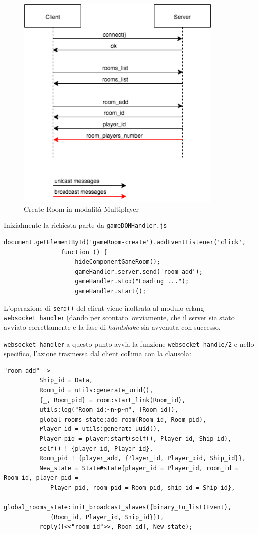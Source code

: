 \documentclass[paper=a4, fontsize=11pt]{scrartcl} %
\numberwithin{equation}{section} %
\numberwithin{figure}{section} %
\numberwithin{table}{section} %
\begin{document}
\begin{figure}
\centering
\includegraphics[width=10cm]{MultiplayerCreateRoom}
\caption{Create Room in modalità Multiplayer}
\label{CreateRoom}
\end{figure}


Inizialmente la richiesta parte da \texttt{gameDOMHandler.js}

\begin{lstlisting}[basicstyle=\footnotesize]
document.getElementById('gameRoom-create').addEventListener('click',
				function () {
                    hideComponentGameRoom();
                    gameHandler.server.send('room_add');
                    gameHandler.stop("Loading ...");
                    gameHandler.start();
\end{lstlisting}

L'operazione di \texttt{send()} del client viene inoltrata al modulo erlang \texttt{websocket\_handler} (dando per scontato, ovviamente, che il server sia stato avviato correttamente e la fase di \textit{handshake} sia avvenuta con successo.

\texttt{websocket\_handler} a questo punto avvia la funzione \texttt{websocket\_handle/2} e nello specifico, l'azione trasmessa dal client collima con la clausola:
\begin{lstlisting}[basicstyle=\footnotesize]
"room_add" ->
          Ship_id = Data,
          Room_id = utils:generate_uuid(),
          {_, Room_pid} = room:start_link(Room_id),
          utils:log("Room id:~n~p~n", [Room_id]),
          global_rooms_state:add_room(Room_id, Room_pid),
          Player_id = utils:generate_uuid(),
          Player_pid = player:start(self(), Player_id, Ship_id),
          self() ! {player_id, Player_id},
          Room_pid ! {player_add, {Player_id, Player_pid, Ship_id}},
          New_state = State#state{player_id = Player_id, room_id = Room_id, player_pid =
          	 Player_pid, room_pid = Room_pid, ship_id = Ship_id},
          global_rooms_state:init_broadcast_slaves({binary_to_list(Event), 
          	 {Room_id, Player_id, Ship_id}}),
          reply([<<"room_id">>, Room_id], New_state);
\end{lstlisting}
\end{document}
